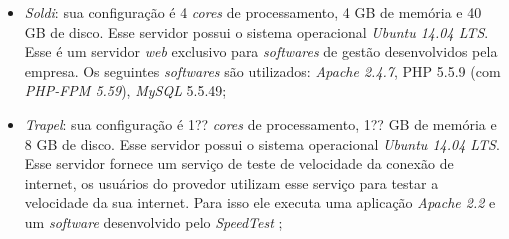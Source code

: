 \begin{itemize}
 \item \textit{Soldi}: sua configuração é 4 \textit{cores} de processamento, 4 GB de memória e 40 GB de disco. Esse servidor possui o 
 sistema operacional \textit{Ubuntu 14.04 \ac{LTS}}. Esse é um servidor \textit{web} exclusivo para \textit{softwares} de gestão desenvolvidos
 pela empresa. Os seguintes \textit{softwares} são utilizados: \textit{Apache 2.4.7}, \ac{PHP} 5.5.9 (com \textit{PHP-FPM 5.59}), 
 \textit{MySQL} 5.5.49;
 
 \item \textit{Trapel}: sua configuração é 1?? \textit{cores} de processamento, 1?? GB de memória e 8 GB de disco. Esse servidor possui o 
 sistema operacional \textit{Ubuntu 14.04 \ac{LTS}}. Esse servidor fornece um serviço de teste de velocidade da conexão de internet, os 
 usuários do provedor utilizam esse serviço para testar a velocidade da sua internet. Para isso ele executa uma aplicação \textit{Apache 2.2} 
 e um \textit{software} desenvolvido pelo \textit{SpeedTest} \cite{speedtest};
\end{itemize}

